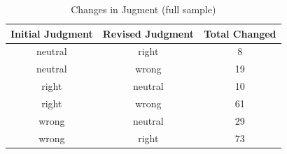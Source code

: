 \documentclass[
  american,
  man,floatsintext]{apa7}
\begin{document}
\begin{table}[tbp]

\begin{center}
\begin{threeparttable}

\caption{\label{tab:tabS6change}Changes in Jugment (full sample)}

\begin{tabular}{ccc}
\toprule
Initial Judgment & \multicolumn{1}{c}{Revised Judgment} & \multicolumn{1}{c}{Total Changed}\\
\midrule
neutral & right & 8\\
neutral & wrong & 19\\
right & neutral & 10\\
right & wrong & 61\\
wrong & neutral & 29\\
wrong & right & 73\\
\bottomrule
\end{tabular}

\end{threeparttable}
\end{center}

\end{table}
\end{document}
